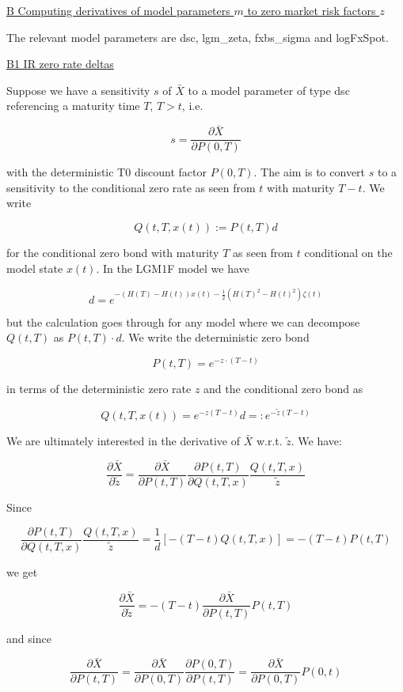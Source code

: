 \underline{B Computing derivatives of model parameters $m$ to zero market risk factors $z$}

The relevant model parameters are dsc, lgm\_zeta, fxbs\_sigma and logFxSpot.

\underline{B1 IR zero rate deltas}

Suppose we have a sensitivity $s$ of $\bar{X}$ to a model parameter of type dsc referencing a maturity time $T$, $T >
t$, i.e.

$$
s = \frac{\partial\bar{X}}{\partial P(0,T)}
$$

with the deterministic T0 discount factor $P(0,T)$. The aim is to convert $s$ to a sensitivity to the conditional zero
rate as seen from $t$ with maturity $T-t$. We write

$$
Q(t,T,x(t)) := P(t,T) d
$$

for the conditional zero bond with maturity $T$ as seen from $t$ conditional on the model state $x(t)$. In the LGM1F
model we have

$$
d = e^{-(H(T)-H(t))x(t) - \frac{1}{2}( H(T)^2 - H(t)^2 ) \zeta(t)}
$$

but the calculation goes through for any model where we can decompose $Q(t,T)$ as $P(t,T)\cdot d$. We write the deterministic zero bond

$$
P(t,T) = e^{-z\cdot(T-t)}
$$

in terms of the deterministic zero rate $z$ and the conditional zero bond as

$$
Q(t,T,x(t)) = e^{-z (T-t)} d =: e^{-\tilde{z} (T-t)}
$$

We are ultimately interested in the derivative of $\bar{X}$ w.r.t. $\tilde{z}$. We have:

$$
\frac{\partial \bar{X}}{\partial{\tilde{z}}} = \frac{\partial \bar{X}}{\partial P(t,T)} \frac{\partial P(t,T)}{\partial Q(t,T,x)} \frac{Q(t,T,x)}{\tilde{z}}
$$

Since

$$
\frac{\partial P(t,T)}{\partial Q(t,T,x)} \frac{Q(t,T,x)}{\tilde{z}} = \frac{1}{d} \left[ -(T-t) Q(t,T,x) \right] = -(T-t)P(t,T)
$$

we get

$$
\frac{\partial \bar{X}}{\partial{\tilde{z}}} = -(T-t) \frac{\partial \bar{X}}{\partial P(t,T)} P(t,T)
$$

and since

$$
\frac{\partial \bar{X}}{\partial P(t,T)} = \frac{\partial \bar{X}}{\partial P(0,T)} \frac{\partial P(0,T)}{\partial P(t,T)} =  \frac{\partial \bar{X}}{\partial P(0,T)} P(0,t)
$$

